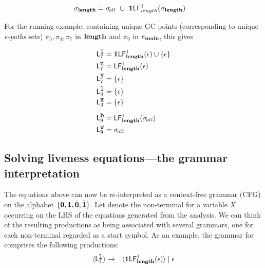 \documentclass[10pt]{sigplanconf}
\begin{document}
\begin{align*}
\sigma_{\mathbf{length}}    &=
 \sigma_{\!all}  ~\cup~ \mathbf{1}\mathsf{LF}_{\mathit length}^{1}( {\mathit \sigma_{\mathit{\mathbf{length}}}})
\end{align*}

For the running example, containing unique GC points (corresponding to unique {\em e-paths} sets) $\pi_3, \pi_4, \pi_7$ in $\mathbf{length}$ and
$\pi_9$ in $e_{\mathbf{main}}$, this gives

\begin{align*}
\mathsf{L}_{{7}}^{\mbox{\tt l}} &= \mathbf{1}\mathsf{LF}_{\mathit {\mathbf{length}}}^{1}( {\mathit \epsilon}) \cup \lbrace\epsilon\rbrace \\
\mathsf{L}_{{7}}^{\mbox{\tt u}} &= \mathsf{LF}_{\mathit {\mathbf{length}}}^{1}( {\mathit \epsilon}) \\
\mathsf{L}_{{7}}^{\mbox{\tt y}} &= \lbrace\epsilon\rbrace \\
\mathsf{L}_{{3}}^{\mbox{\tt l}} &= \lbrace\epsilon\rbrace \\
\mathsf{L}_{{3}}^{\mbox{\tt x}} &= \lbrace\epsilon\rbrace 
\\[1ex]
  \mathsf{L}_{{9}}^{\mbox{\tt b}}  &= \mathsf{LF}_{\mathit {\mathbf{length}}}^{1}( {\mathit \sigma_{\mathit{\!all}}}) \\
  \mathsf{L}_{{9}}^{\mbox{\tt w}}  &= \sigma_{\mathit{\!all}}
\end{align*}

\subsection{Solving liveness equations---the grammar interpretation}
The  equations above can now be re-interpreted as a
context-free grammar (CFG)  on the alphabet $\lbrace\mathbf{0}, \mathbf{1},
\bar{\mathbf{0}}, \bar{\mathbf{1}}\rbrace$.  Let   denote the non-terminal for
a variable  $X$ occurring on  the LHS of the  equations generated
from the analysis.  We can  think of the resulting productions as
being associated with several  grammars, one for each non-terminal
 regarded as a start symbol.  As an example, the
grammar    for      comprises    the   following
productions:
 \begin{eqnarray*}
\var{\Lanv{7}{\xl}}  &\rightarrow&   \var{\acdr \Lf
  {\length}{1}{\epsilon}} \mid \epsilon \\
\end{eqnarray*}


\end{document}
